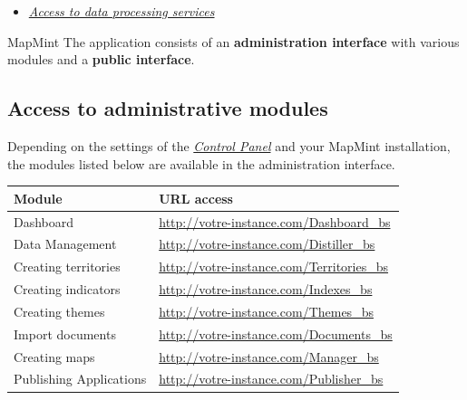 \documentclass[letterpaper,10pt,english]{sphinxmanual}
\begin{document}
{\begin{minipage}{0.95\linewidth}
\begin{itemize}
\begin{itemize}
\begin{itemize}
\item {} 
\label{introduction/usemapmint:id11}{\hyperref[introduction/usemapmint:acceder-aux-services-de-traitements-de-donnees]{\emph{Access to data processing services}}}

\end{itemize}

\end{itemize}

\end{itemize}
\end{minipage}}
\begin{center}\setlength{\fboxsep}{5pt}\end{center}

MapMint The application consists of an \textbf{administration interface} with various modules and a \textbf{public interface}.


\subsection{Access to administrative modules}
\label{introduction/usemapmint:acces-aux-modules-d-administration}\label{introduction/usemapmint:introduction-usemapmint-administration-access}
Depending on the settings of the {\hyperref[dashboard/configuration::doc]{\emph{\emph{Control Panel}}}} and your MapMint installation, the modules listed below are available in the administration interface.

\begin{tabulary}{\linewidth}{|L|L|}
\hline

\textbf{Module}
 & 
\textbf{URL access}
\\
\hline
Dashboard
 & 
\href{http://votre-instance.com/Dashboard\_bs}{http://votre-instance.com/Dashboard\_bs}
\\
\hline
Data Management
 & 
\href{http://votre-instance.com/Distiller\_bs}{http://votre-instance.com/Distiller\_bs}
\\
\hline
Creating territories
 & 
\href{http://votre-instance.com/Territories\_bs}{http://votre-instance.com/Territories\_bs}
\\
\hline
Creating indicators
 & 
\href{http://votre-instance.com/Indexes\_bs}{http://votre-instance.com/Indexes\_bs}
\\
\hline
Creating themes
 & 
\href{http://votre-instance.com/Themes\_bs}{http://votre-instance.com/Themes\_bs}
\\
\hline
Import documents
 & 
\href{http://votre-instance.com/Documents\_bs}{http://votre-instance.com/Documents\_bs}
\\
\hline
Creating maps
 & 
\href{http://votre-instance.com/Manager\_bs}{http://votre-instance.com/Manager\_bs}
\\
\hline
Publishing Applications
 & 
\href{http://votre-instance.com/Publisher\_bs}{http://votre-instance.com/Publisher\_bs}
\\
\hline\end{tabulary}
\end{document}
